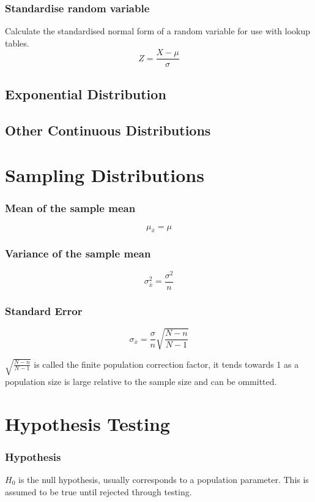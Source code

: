 \documentclass{article}
\begin{document}
\subsubsection{Standardise random variable}
Calculate the standardised normal form of a random variable for use with lookup tables.
$$
Z = \frac{X - \mu}{\sigma}
$$

\subsection{Exponential Distribution}

\subsection{Other Continuous Distributions}

\section{Sampling Distributions}

\subsubsection{Mean of the sample mean}

$$
\mu_{\bar{x}}=\mu
$$

\subsubsection{Variance of the sample mean}

$$
\sigma^2_{\bar{x}} = \frac{\sigma^2}{n}
$$

\subsubsection{Standard Error}

$$
\sigma_{\bar{x}} = \frac{\sigma}{n} \sqrt{\frac{N - n}{N - 1}}
$$

$ \sqrt{\frac{N - n}{N - 1}} $ is called the finite population correction factor, it tends towards 1 as a population size is large relative to the sample size and can be ommitted.




\section{Hypothesis Testing}

\subsubsection{Hypothesis}
$H_0$ is the null hypothesis, usually corresponds to a population parameter. This is assumed to be true until rejected through testing.
\end{document}
